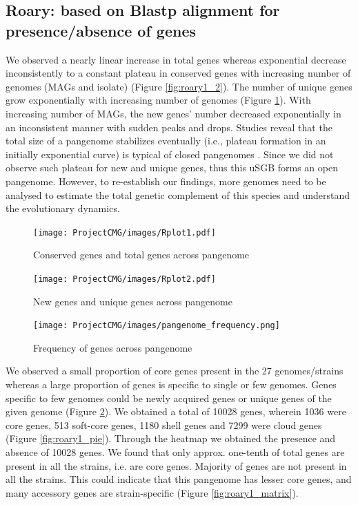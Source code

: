 \documentclass[11pt]{article}
\begin{document}
\subsection{Roary: based on Blastp alignment for presence/absence of genes}
We observed a nearly linear increase in total genes whereas exponential decrease inconsistently to a constant plateau in conserved genes with increasing number of genomes (MAGs and isolate) (Figure \ref{fig:roary1_2}). The number of unique genes grow  exponentially with increasing number of genomes (Figure \ref{fig:roary1_3}). With increasing number of MAGs, the new genes' number decreased exponentially in an inconsistent manner with sudden peaks and drops. Studies reveal that the total size of a pangenome stabilizes eventually (i.e., plateau formation in an initially exponential curve) is typical of closed pangenomes \cite{Tettelin2055}\cite{TETTELIN2008472}. Since we did not observe such plateau for new and unique genes, thus this uSGB forms an open pangenome. However, to re-establish our findings, more genomes need to be analysed to estimate the total genetic complement of this species and understand the evolutionary dynamics. \\

\begin{figure}[!htb]
   \begin{minipage}{0.48\textwidth}
     \centering
     \texttt{[image: ProjectCMG/images/Rplot1.pdf]}
     \caption{Conserved genes and total genes across pangenome}\label{fig:roary1_2}
   \end{minipage}\hfill
   \begin{minipage}{0.48\textwidth}
     \centering
     \texttt{[image: ProjectCMG/images/Rplot2.pdf]}
     \caption{New genes and unique genes across pangenome}\label{fig:roary1_3}
   \end{minipage}
\end{figure}

\begin{figure}
    \centering
     \texttt{[image: ProjectCMG/images/pangenome\_frequency.png]}
     \caption{Frequency of genes across pangenome }\label{fig:roary1_freq}
\end{figure}

We observed a small proportion of core genes present in the 27 genomes/strains whereas a large proportion of genes is specific to single or few genomes. Genes specific to few genomes could be newly acquired genes or unique genes of the given genome (Figure \ref{fig:roary1_freq}). We obtained a total of 10028 genes, wherein 1036 were core genes, 513 soft-core genes, 1180 shell genes and 7299 were cloud genes (Figure \ref{fig:roary1_pie}). Through the heatmap we obtained the presence and absence of 10028 genes. We found that only approx. one-tenth of total genes are present in all the strains, i.e. are core genes. Majority of genes are not present in all the strains. This could indicate that this pangenome has lesser core genes, and many accessory genes are strain-specific (Figure \ref{fig:roary1_matrix}). 
\end{document}
